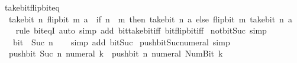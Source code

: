 \begin{isabellebody}
\endisatagproof
{\isafoldproof}%
%
\isadelimproof
\isanewline
%
\endisadelimproof
\isanewline
{}\isamarkupfalse%
\ take{\isacharunderscore}{\kern0pt}bit{\isacharunderscore}{\kern0pt}flip{\isacharunderscore}{\kern0pt}bit{\isacharunderscore}{\kern0pt}eq{\isacharcolon}{\kern0pt}\isanewline
\ \ {\isacartoucheopen}take{\isacharunderscore}{\kern0pt}bit\ n\ {\isacharparenleft}{\kern0pt}flip{\isacharunderscore}{\kern0pt}bit\ m\ a{\isacharparenright}{\kern0pt}\ {\isacharequal}{\kern0pt}\ {\isacharparenleft}{\kern0pt}if\ n\ {\isasymle}\ m\ then\ take{\isacharunderscore}{\kern0pt}bit\ n\ a\ else\ flip{\isacharunderscore}{\kern0pt}bit\ m\ {\isacharparenleft}{\kern0pt}take{\isacharunderscore}{\kern0pt}bit\ n\ a{\isacharparenright}{\kern0pt}{\isacharparenright}{\kern0pt}{\isacartoucheclose}\isanewline
%
\isadelimproof
\ \ %
\endisadelimproof
%
\isatagproof
{}\isamarkupfalse%
\ {\isacharparenleft}{\kern0pt}rule\ bit{\isacharunderscore}{\kern0pt}eqI{\isacharparenright}{\kern0pt}\ {\isacharparenleft}{\kern0pt}auto\ simp\ add{\isacharcolon}{\kern0pt}\ bit{\isacharunderscore}{\kern0pt}take{\isacharunderscore}{\kern0pt}bit{\isacharunderscore}{\kern0pt}iff\ bit{\isacharunderscore}{\kern0pt}flip{\isacharunderscore}{\kern0pt}bit{\isacharunderscore}{\kern0pt}iff{\isacharparenright}{\kern0pt}%
\endisatagproof
{\isafoldproof}%
%
\isadelimproof
\isanewline
%
\endisadelimproof
\isanewline
{}\isamarkupfalse%
\ not{\isacharunderscore}{\kern0pt}bit{\isacharunderscore}{\kern0pt}{}{\isacharunderscore}{\kern0pt}Suc\ {\isacharbrackleft}{\kern0pt}simp{\isacharbrackright}{\kern0pt}{\isacharcolon}{\kern0pt}\isanewline
\ \ {\isacartoucheopen}{\isasymnot}\ bit\ {}\ {\isacharparenleft}{\kern0pt}Suc\ n{\isacharparenright}{\kern0pt}{\isacartoucheclose}\isanewline
%
\isadelimproof
\ \ %
\endisadelimproof
%
\isatagproof
{}\isamarkupfalse%
\ {\isacharparenleft}{\kern0pt}simp\ add{\isacharcolon}{\kern0pt}\ bit{\isacharunderscore}{\kern0pt}Suc{\isacharparenright}{\kern0pt}%
\endisatagproof
{\isafoldproof}%
%
\isadelimproof
\isanewline
%
\endisadelimproof
\isanewline
{}\isamarkupfalse%
\ push{\isacharunderscore}{\kern0pt}bit{\isacharunderscore}{\kern0pt}Suc{\isacharunderscore}{\kern0pt}numeral\ {\isacharbrackleft}{\kern0pt}simp{\isacharbrackright}{\kern0pt}{\isacharcolon}{\kern0pt}\isanewline
\ \ {\isacartoucheopen}push{\isacharunderscore}{\kern0pt}bit\ {\isacharparenleft}{\kern0pt}Suc\ n{\isacharparenright}{\kern0pt}\ {\isacharparenleft}{\kern0pt}numeral\ k{\isacharparenright}{\kern0pt}\ {\isacharequal}{\kern0pt}\ push{\isacharunderscore}{\kern0pt}bit\ n\ {\isacharparenleft}{\kern0pt}numeral\ {\isacharparenleft}{\kern0pt}Num{\isachardot}{\kern0pt}Bit{}\ k{\isacharparenright}{\kern0pt}{\isacharparenright}{\kern0pt}{\isacartoucheclose}\isanewline

\end{isabellebody}
